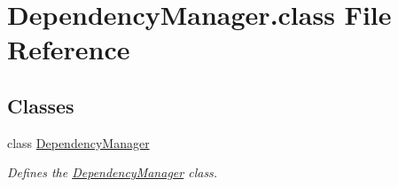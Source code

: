\hypertarget{DependencyManager_8class}{\section{Dependency\-Manager.\-class File Reference}
\label{DependencyManager_8class}
}
\subsection*{Classes}
\begin{DoxyCompactItemize}
\item 
class \hyperlink{classDependencyManager}{Dependency\-Manager}
\begin{DoxyCompactList}\small\item\em Defines the \hyperlink{classDependencyManager}{Dependency\-Manager} class. \end{DoxyCompactList}\end{DoxyCompactItemize}
